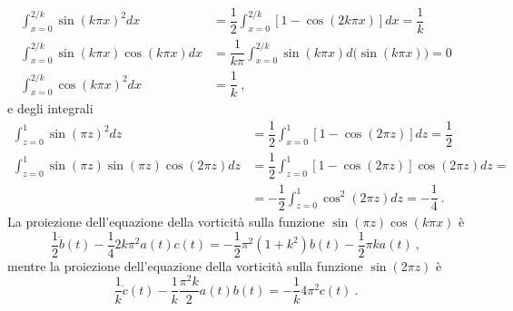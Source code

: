 \documentclass{article}
\begin{document}
\begin{equation}
\begin{aligned}
 \int_{x=0}^{2/k} \sin{(k \pi x)}^2 dx & = \dfrac{1}{2} \int_{x=0}^{2/k} \left[ 1 - \cos{(2 k \pi x)} \right] dx = \dfrac{1}{k} \\
 \int_{x=0}^{2/k} \sin{(k \pi x)}\cos{(k \pi x)} dx & = \dfrac{1}{k \pi} \int_{x=0}^{2/k} \sin{(k \pi x)} d \big( \sin{(k \pi x)} \big) = 0 \\
 \int_{x=0}^{2/k} \cos{(k \pi x)}^2 dx & = \dfrac{1}{k} \ ,
\end{aligned}
\end{equation}
e degli integrali
\begin{equation}
\begin{aligned}
 \int_{z=0}^{1} \sin{(\pi z)}^2 dz & = \dfrac{1}{2} \int_{x=0}^{1} \left[ 1 - \cos{(2\pi z)} \right] dz = \dfrac{1}{2} \\
 \int_{z=0}^{1} \sin{(\pi z)} \sin{(\pi z)} \cos{(2\pi z)} dz  & =
 \dfrac{1}{2} \int_{z=0}^{1} \left[ 1 - \cos{(2\pi z)} \right]  \cos{(2\pi z)} dz = \\
 & = - \dfrac{1}{2} \int_{z=0}^{1} \cos^2{(2\pi z)}  dz = 
  - \dfrac{1}{4} \ .
\end{aligned}
\end{equation}
%
La proiezione dell'equazione della vorticità sulla funzione $\sin{(\pi z)} \cos{(k \pi x)}$ è
\begin{equation}
    \dfrac{1}{2}\dot{b}(t) - \dfrac{1}{4} 2 k \pi^2 a(t) c(t) =
    -\dfrac{1}{2} \pi^2 (1+k^2) b(t) - \dfrac{1}{2}\pi k a(t) \ ,
\end{equation}
mentre la proiezione dell'equazione della vorticità sulla funzione $\sin{(2 \pi z)}$ è
\begin{equation}
    \dfrac{1}{k}\dot{c}(t) - \dfrac{1}{k} \dfrac{\pi^2 k}{2} a(t) b(t) =
    - \dfrac{1}{k} 4 \pi^2 c(t) \ .
\end{equation}
%
%
\end{document}
